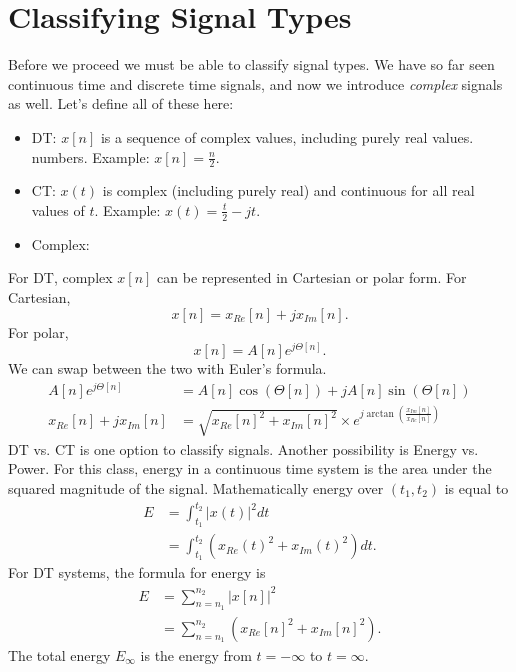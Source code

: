 \section{Classifying Signal Types}
Before we proceed we must be able to classify signal types. We
have so far seen continuous time and discrete time signals,
and now we introduce \emph{complex} signals as well. Let's define
all of these here:
\begin{itemize}
    \item DT: $x[n]$ is a sequence of complex values, including purely real values.
          numbers. Example: $x[n] = \frac{n}{2}$.
    \item CT: $x(t)$ is complex (including purely real) and continuous for all real values of $t$.
          Example: $x(t) = \frac{t}{2} -jt$.
    \item Complex:
\end{itemize}

For DT, complex $x[n]$ can be represented in Cartesian or polar form.
For Cartesian,
\begin{equation}
    x[n] = x_{Re}[n] + jx_{Im}[n].
\end{equation}
For polar,
\begin{equation}
    x[n] = A[n]e^{j\Theta[n]}.
\end{equation}
We can swap between the two with Euler's formula.
\begin{align}
    A[n]e^{j\Theta[n]}     & = A[n]\cos(\Theta[n]) + jA[n]\sin(\Theta[n])                                        \\
    x_{Re}[n] + jx_{Im}[n] & = \sqrt{x_{Re}[n]^2 + x_{Im}[n]^2} \times e^{j\arctan(\frac{x_{Im}[n]}{x_{Re}[n]})}
\end{align}
DT vs. CT is one option to classify signals. Another
possibility is Energy vs. Power. For this class, energy in a continuous
time system is the area under the squared magnitude of the signal. Mathematically
energy over $(t_1, t_2)$ is equal to
\begin{align}
    E & = \int_{t_1}^{t_2} |x(t)|^2 dt                     \\
      & = \int_{t_1}^{t_2} (x_{Re}(t)^2 + x_{Im}(t)^2) dt.
\end{align}
For DT systems, the formula for energy is
\begin{align}
    E & = \sum_{n=n_1}^{n_2} |x[n]|^2                     \\
      & = \sum_{n=n_1}^{n_2} (x_{Re}[n]^2 + x_{Im}[n]^2).
\end{align}
The total energy $E_\infty$ is the energy from $t = -\infty$ to $t = \infty$.

